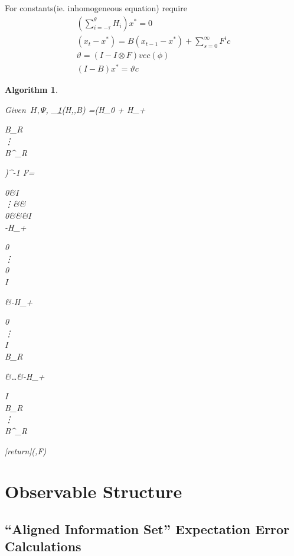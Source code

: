 \documentclass{article}
\newtheorem{algrthm}{Algorithm}
\begin{document}
{For constants(ie. inhomogeneous equation) require
\begin{gather*}
(\sum_{i=-\tau}^\theta H_i) x^\ast =0\\
  (x_t-x^\ast)= B(x_{t-1}-x^\ast) + \sum_{s=0}^\infty F^i c\\
\vartheta=( I - I\otimes F) vec(\phi)\\
(I - B) x^\ast = \vartheta c
\end{gather*}

\begin{algrthm}
\label{alg:inhomog}
\begin{program}
\mbox{Given $H,\Psi$,}
\FUNCT {}_{\ref{alg:inhomog}}(H,\Psi,B)
\Phi=(H_0 + H_+  \begin{bmatrix}B_R\\\vdots\\B^\theta_R \end{bmatrix})^{-1}
F=\begin{bmatrix}
0&I\\\vdots&&\ddots\\0&&&I\\-\Phi H_+\begin{bmatrix}0\\ \vdots \\ 0\\I  \end{bmatrix}&-\Phi H_+\begin{bmatrix}0\\ \vdots\\I\\B_R  \end{bmatrix}&\ldots&-\Phi H_+\begin{bmatrix}I\\B_R\\\vdots\\B^{}_R  \end{bmatrix}\end{bmatrix}
|return|(\Phi,F)
\ENDFUNCT
\end{program}
\end{algrthm}

\section{Observable Structure}
\label{sec:applications}


\subsection{``Aligned Information Set'' Expectation Error Calculations}
\label{sec:errorCalc}

}
\end{document}
